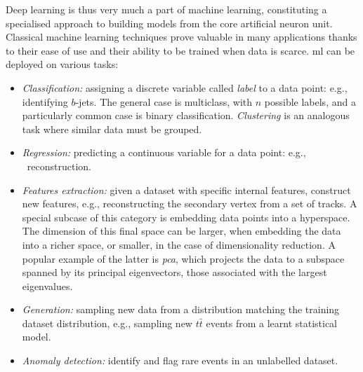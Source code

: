 Deep learning is thus very much a part of machine learning, constituting a specialised approach to building models from the core artificial neuron unit. Classical machine learning techniques prove valuable in many applications thanks to their ease of use and their ability to be trained when data is scarce. \gls{ml} can be deployed on various tasks: 
\begin{itemize}
    \item \textit{Classification:} assigning a discrete variable called \textit{label} to a data point: e.g., identifying $b$-jets. The general case is multiclass, with $n$ possible labels, and a particularly common case is binary classification. \textit{Clustering} is an analogous task where similar data must be grouped.
    \item \textit{Regression:} predicting a continuous variable for a data point: e.g., \pt\ reconstruction. 
    \item \textit{Features extraction:} given a dataset with specific internal features, construct new features, e.g., reconstructing the secondary vertex from a set of tracks. A special subcase of this category is embedding data points into a hyperspace. The dimension of this final space can be larger, when embedding the data into a richer space, or smaller, in the case of dimensionality reduction. A popular example of the latter is \textit{\gls{pca}}, which projects the data to a subspace spanned by its principal eigenvectors, those associated with the largest eigenvalues.
    \item \textit{Generation:} sampling new data from a distribution matching the training dataset distribution, e.g., sampling new $t\bar{t}$ events from a learnt statistical model. 
    \item \textit{Anomaly detection:} identify and flag rare events in an unlabelled dataset.
\end{itemize}

